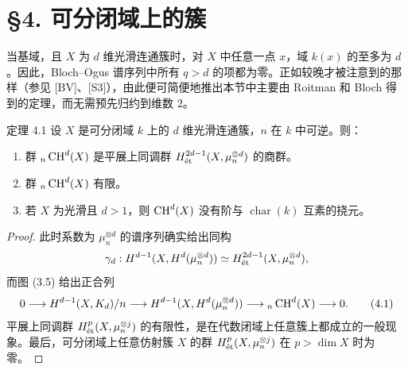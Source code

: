 \section*{§4. 可分闭域上的簇}
当基域，且 $X$ 为 $d$ 维光滑连通簇时，对 $X$ 中任意一点 $x$，域 $k(x)$ 的至多为 $d$。因此，Bloch--Ogus 谱序列中所有 $q>d$ 的项都为零。正如较晚才被注意到的那样（参见 [BV]、[S3]），由此便可简便地推出本节中主要由 Roitman 和 Bloch 得到的定理，而无需预先归约到维数 $2$。

\begin{statement}{定理 4.1}
设 $X$ 是可分闭域 $k$ 上的 $d$ 维光滑连通簇，$n$ 在 $k$ 中可逆。则：
\begin{enumerate}[label=(\roman*)]
\item 群 ${}_n\operatorname{CH}^d(X)$ 是平展上同调群 $H^{2d-1}_{\mathrm{\acute et}}(X,\mu_n^{\otimes d})$ 的商群。
\item 群 ${}_n\operatorname{CH}^d(X)$ 有限。
\item 若 $X$ 为光滑且 $d>1$，则 $\operatorname{CH}^d(X)$ 没有阶与 $\operatorname{char}(k)$ 互素的挠元。
\end{enumerate}
\end{statement}
\begin{proof}
此时系数为 $\mu_n^{\otimes d}$ 的谱序列确实给出同构
\[
\gamma_d:H^{d-1}(X,H^d(\mu_n^{\otimes d}))\simeq H^{2d-1}_{\mathrm{\acute et}}(X,\mu_n^{\otimes d}),
\]
而图 (3.5) 给出正合列
\begin{equation*}
0\longrightarrow H^{d-1}(X,K_d)/n\longrightarrow H^{d-1}(X,H^d(\mu_n^{\otimes d}))\longrightarrow{}_n\operatorname{CH}^d(X)\longrightarrow0.\tag{4.1}
\end{equation*}
平展上同调群 $H^p_{\mathrm{\acute et}}(X,\mu_n^{\otimes j})$ 的有限性，是在代数闭域上任意簇上都成立的一般现象。最后，可分闭域上任意仿射簇 $X$ 的群 $H^p_{\mathrm{\acute et}}(X,\mu_n^{\otimes j})$ 在 $p>\dim X$ 时为零。
\end{proof}

